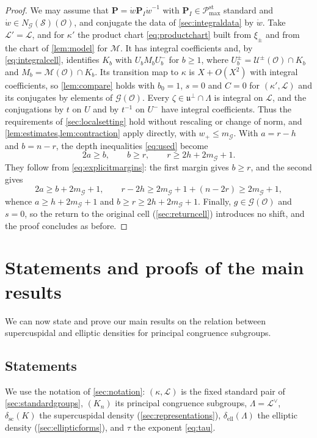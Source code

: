 \documentclass[11pt,reqno]{amsart}
\numberwithin{equation}{section}
\theoremstyle{plain}
\theoremstyle{definition}
\theoremstyle{remark}
\theoremstyle{plain}
\newcommand{\OO}{\mathcal{O}}    %
\newcommand{\Lat}{\mathcal{L}}   %
\newcommand{\dLat}{\Lambda}      %
\newcommand{\bG}{\mathbf{G}}     %
\newcommand{\bP}{\mathbf{P}}     %
\newcommand{\g}{\mathfrak{g}}    %
\newcommand{\gd}{\mathfrak{g}^*} %
\newcommand{\uu}{\mathfrak{u}}   %
\newcommand{\scd}[1]{\delta_{\mathrm{sc}}(#1)}
\newcommand{\elld}[2][]{\delta_{\mathrm{ell}}^{#1}(#2)}  %
\newcommand{\Pc}{\mathscr{P}^{\mathrm{st}}_{\mathrm{max}}}    %
\newcommand{\cG}{\mathcal{G}}                   %
\newcommand{\cM}{\mathcal{M}}                   %
\newcommand{\cU}{\mathcal{U}}                   %
\newcommand{\cS}{\mathcal{S}}                   %
\newcommand{\eexp}{\tau}
\newcommand{\nf}{\zeta}
\begin{document}
\begin{proof}
We may assume that $\bP=\dot w\bP_I\dot w^{-1}$ with $\bP_I\in\Pc$ standard and
$\dot w\in N_{\cG}(\cS)(\OO)$, and conjugate the data of
\cref{sec:integraldata} by $\dot w$. Take $\Lat'=\Lat$, and for $\kappa'$ the
product chart \eqref{eq:productchart} built from $\xi_\pm$ and from the chart
of \cref{lem:model} for $\cM$. It has integral coefficients and, by
\eqref{eq:integralcell}, identifies $K_b$ with $U_bM_bU^-_b$ for $b\ge1$, where
$U^\pm_b=\cU^\pm(\OO)\cap K_b$ and $M_b=\cM(\OO)\cap K_b$. Its transition map
to $\kappa$ is $X+O(X^2)$ with integral coefficients, so \cref{lem:compare}
holds with $b_0=1$, $s=0$ and $C=0$ for $(\kappa',\Lat)$ and its conjugates by
elements of $\cG(\OO)$. Every $\nf\in\uu^\perp\cap\dLat$ is integral on
$\Lat$, and the conjugations by $t$ on $U$ and by $t^{-1}$ on $U^-$ have
integral coefficients. Thus the requirements of \cref{sec:localsetting} hold
without rescaling or change of norm, and
\cref{lem:estimates,lem:contraction} apply directly, with $w_+\le m_{\cG}$.
With $a=r-h$ and $b=n-r$, the depth inequalities \eqref{eq:used} become
\[
2a\ge b,\qquad b\ge r,\qquad r\ge2h+2m_{\cG}+1.
\]
They follow from \eqref{eq:explicitmargins}: the first margin gives $b\ge r$,
and the second gives
\[
2a\ge b+2m_{\cG}+1,\qquad
r-2h\ge2m_{\cG}+1+(n-2r)\ge2m_{\cG}+1,
\]
whence $a\ge h+2m_{\cG}+1$ and $b\ge r\ge2h+2m_{\cG}+1$. Finally, $g\in\cG(\OO)$
and $s=0$, so the return to the original cell (\cref{sec:returncell})
introduces no shift, and the proof concludes as before.
\end{proof}

\section{Statements and proofs of the main results}\label{sec:proofs}

We can now state and prove our main results on the relation between supercuspidal and elliptic densities
for principal congruence subgroups.

\subsection{Statements}\label{sec:statements}
We use the notation of \cref{sec:notation}: $(\kappa,\Lat)$ is
the fixed standard pair of \cref{sec:standardgroups}, $(K_n)$ its
principal congruence subgroups, $\dLat=\Lat^\vee$, $\scd{K}$ the
supercuspidal density (\cref{sec:representations}),
$\elld{\dLat}$ the elliptic density (\cref{sec:ellipticforms}), and
$\eexp$ the exponent \eqref{eq:tau}.
\end{document}
